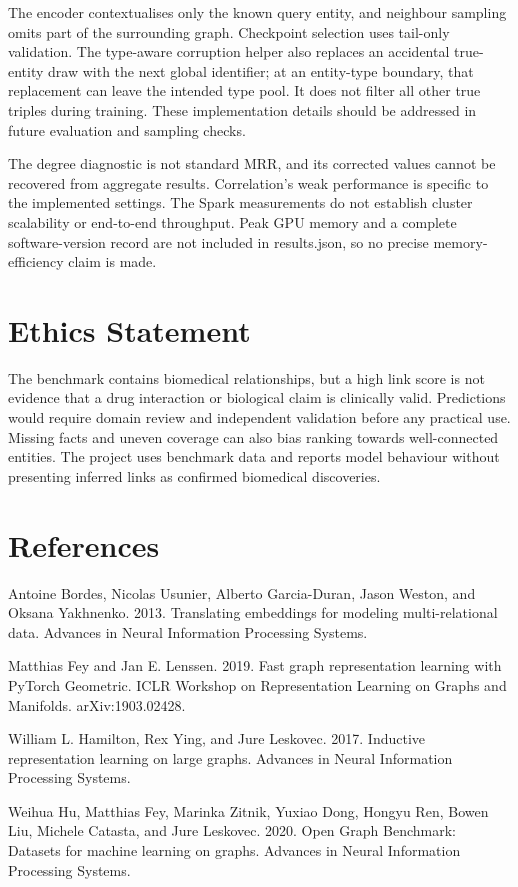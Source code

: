 \documentclass[11pt]{article}
\begin{document}
The encoder contextualises only the known query entity, and neighbour sampling omits part of the surrounding graph. Checkpoint selection uses tail-only validation. The type-aware corruption helper also replaces an accidental true-entity draw with the next global identifier; at an entity-type boundary, that replacement can leave the intended type pool. It does not filter all other true triples during training. These implementation details should be addressed in future evaluation and sampling checks.

The degree diagnostic is not standard MRR, and its corrected values cannot be recovered from aggregate results. Correlation's weak performance is specific to the implemented settings. The Spark measurements do not establish cluster scalability or end-to-end throughput. Peak GPU memory and a complete software-version record are not included in results.json, so no precise memory-efficiency claim is made.

\section*{Ethics Statement}
The benchmark contains biomedical relationships, but a high link score is not evidence that a drug interaction or biological claim is clinically valid. Predictions would require domain review and independent validation before any practical use. Missing facts and uneven coverage can also bias ranking towards well-connected entities. The project uses benchmark data and reports model behaviour without presenting inferred links as confirmed biomedical discoveries.

\section*{References}
Antoine Bordes, Nicolas Usunier, Alberto Garcia-Duran, Jason Weston, and Oksana Yakhnenko. 2013. Translating embeddings for modeling multi-relational data. Advances in Neural Information Processing Systems.

Matthias Fey and Jan E. Lenssen. 2019. Fast graph representation learning with PyTorch Geometric. ICLR Workshop on Representation Learning on Graphs and Manifolds. arXiv:1903.02428.

William L. Hamilton, Rex Ying, and Jure Leskovec. 2017. Inductive representation learning on large graphs. Advances in Neural Information Processing Systems.

Weihua Hu, Matthias Fey, Marinka Zitnik, Yuxiao Dong, Hongyu Ren, Bowen Liu, Michele Catasta, and Jure Leskovec. 2020. Open Graph Benchmark: Datasets for machine learning on graphs. Advances in Neural Information Processing Systems.
\end{document}
